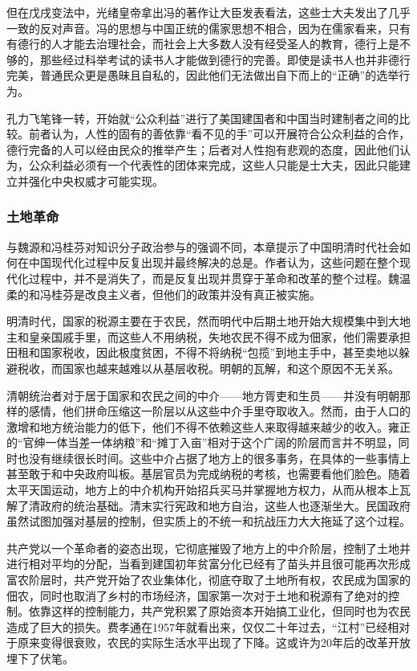 但在戊戌变法中，光绪皇帝拿出冯的著作让大臣发表看法，这些士大夫发出了几乎一致的反对声音。冯的思想与中国正统的儒家思想不相合，因为在儒家看来，只有有德行的人才能去治理社会，而社会上大多数人没有经受圣人的教育，德行上是不够的，那些经过科举考试的读书人才能做到德行的完善。即使是读书人也并非德行完美，普通民众更是愚昧且自私的，因此他们无法做出自下而上的“正确”的选举行为。

孔力飞笔锋一转，开始就“公众利益”进行了美国建国者和中国当时建制者之间的比较。前者认为，人性的固有的善依靠“看不见的手”可以开展符合公众利益的合作，德行完备的人可以经由民众的推举产生；后者对人性抱有悲观的态度，因此他们认为，公众利益必须有一个代表性的团体来完成，这些人只能是士大夫，因此只能建立并强化中央权威才可能实现。

\subsubsection{土地革命}

与魏源和冯桂芬对知识分子政治参与的强调不同，本章提示了中国明清时代社会如何在中国现代化过程中反复出现并最终解决的总是。作者认为，这些问题在整个现代化过程中，并不是消失了，而是反复出现并贯穿于革命和改革的整个过程。魏温柔的和冯桂芬是改良主义者，但他们的政策并没有真正被实施。

明清时代，国家的税源主要在于农民，然而明代中后期土地开始大规模集中到大地主和皇亲国戚手里，而这些人不用纳税，失地农民不得不成为佃家，他们需要承担田租和国家税收，因此极度贫困，不得不将纳税“包揽”到地主手中，甚至卖地以躲避税收，而国家也越来越难以从基层收税。明朝的瓦解，和这个原因不无关系。

清朝统治者对于居于国家和农民之间的中介——地方胥吏和生员——并没有明朝那样的感情，他们拼命压缩这一阶层以从这些中介手里夺取收入。然而，由于人口的激增和地方统治能力的低下，他们不得不依赖这些人来取得越来越少的收入。雍正的“官绅一体当差一体纳粮”和“摊丁入亩”相对于这个广阔的阶层而言并不明显，同时也没有继续很长时间。这些中介占据了地方上的很多事务，在具体的一些事情上甚至敢于和中央政府叫板。基层官员为完成纳税的考核，也需要看他们脸色。随着太平天国运动，地方上的中介机构开始招兵买马并掌握地方权力，从而从根本上瓦解了清政府的统治基础。清末实行宪政和地方自治，这些人也逐渐坐大。民国政府虽然试图加强对基层的控制，但实质上的不统一和抗战压力大大拖延了这个过程。

共产党以一个革命者的姿态出现，它彻底摧毁了地方上的中介阶层，控制了土地并进行相对平均的分配，当看到建国初年贫富分化已经有了苗头并且很可能再次形成富农阶层时，共产党开始了农业集体化，彻底夺取了土地所有权，农民成为国家的佃农，同时也取消了乡村的市场经济，国家第一次对于土地和税源有了绝对的控制。依靠这样的控制能力，共产党积累了原始资本开始搞工业化，但同时也为农民造成了巨大的损失。费孝通在1957年就看出来，仅仅二十年过去，“江村”已经相对于原来变得很衰败，农民的实际生活水平出现了下降。这或许为20年后的改革开放埋下了伏笔。


